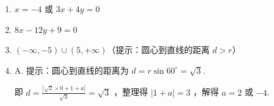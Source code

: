 \begin{tips}
\begin{enumerate}
              则 $d=\sqrt{r^2-\left(\frac{|C D|}{2}\right)^2}=\sqrt{5^2-4^2}=3^{\prime}$

              又因为直线 $m$ 经过点 $P(4,-4)$

              当直线 $m$ 的斜率不存在时，则直线 $m$ 的方程为 $x=4$

              点 $M(1,2)$ 到 $m$ 的距离为 $|4-1|=3$ ，符合题意；

              当直线 $m$ 的斜率存在时，设直线 $m$ 的方程为 $y+4=k(x-4)$ ，即 $k x-y-4 k-4=0$

              则 $d=\frac{|k-2-4 k-4|}{\sqrt{k^2+1}}=\frac{3|k+2|}{\sqrt{k^2+1}}=3$ ，解得 $k=-\frac{3}{4}$

              此时直线 $m$ 的方程为 $y-2=-\frac{3}{4}(x-1)$ ，即 $3 x+4 y+4=0$.

              所以直线 $m$ 的方程为 $3 x+4 y+4=0$ 或 $x=4$ ．
        \item $x=-4$ 或 $3 x+4 y=0$
        \item $8 x-12 y+9=0$
        \item $(-\infty,-5) \cup(5,+\infty)$（提示：圆心到直线的距离 $d > r$）
        \item A. 提示：圆心到直线的距离为 $d=r \sin 60^{\circ}=\sqrt{3}$.

              即 $d=\frac{|\sqrt{2} \times 0+1+a|}{\sqrt{3}}=\sqrt{3}$ ，整理得 $|1+a|=3$ ，解得 $a=2$ 或 $-4$.
    \end{enumerate}
\end{tips}

\pagebreak
